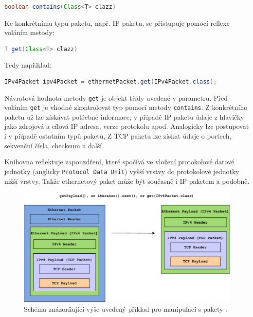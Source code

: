 \begin{lstlisting}[language=Java]
    boolean contains(Class<T> clazz)
\end{lstlisting}

\noindent Ke konkrétnímu typu paketu, např. IP paketu, se přistupuje pomocí reflexe voláním metody:

\begin{lstlisting}[language=Java]
    T get(Class<T> clazz)
\end{lstlisting}

\noindent Tedy například:

\begin{lstlisting}[language=Java]
    IPv4Packet ipv4Packet = ethernetPacket.get(IPv4Packet.class);
\end{lstlisting}

\noindent Návratová hodnota metody \texttt{get} je objekt třídy uvedené v parametru. Před voláním \texttt{get} je vhodné zkontrolovat typ pomocí metody \texttt{contains}. Z konkrétního paketu už lze získávat potřebné informace, v případě IP paketu údaje z hlavičky jako zdrojová a cílová IP adresa, verze protokolu apod. Analogicky lze postupovat i v případě ostatním typů paketů, Z TCP paketu lze získat údaje o portech, sekvenční čísla, checksum a další.

Knihovna reflektuje zapouzdření, které spočívá ve vložení protokolové datové jednotky (anglicky \texttt{Protocol Data Unit}) vyšší vrstvy do protokolové jednotky nižší vrstvy. Takže ethernetový paket může být současně i IP paketem a podobně.

\begin{figure}[!h]
  \centering
  \includegraphics[width=15cm]{template-fig/Pcap4JExample.pdf}
  \caption{Schéma znázorňující výše uvedený příklad pro manipulaci s pakety \cite{gitPcap4J}.}
  \label{FIG_Pcap4JExample}
\end{figure}

